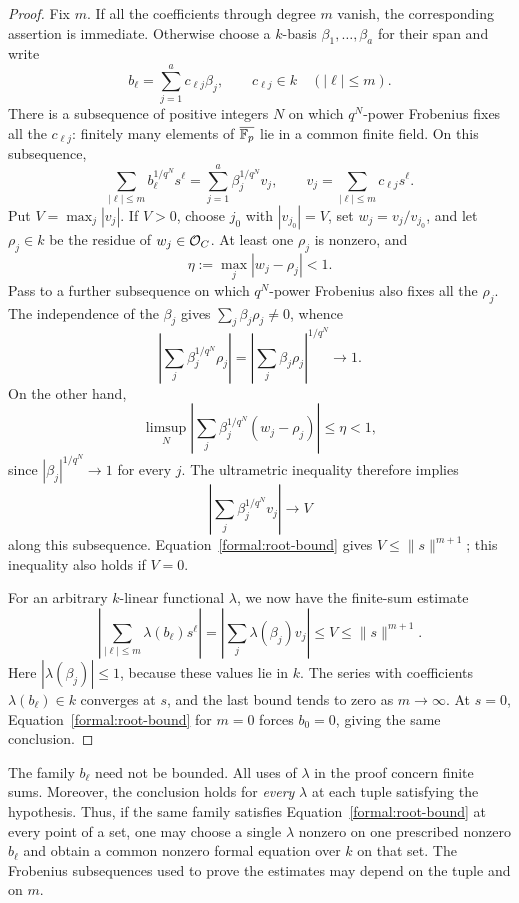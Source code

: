 \begin{proof}
Fix $m$. If all the coefficients through degree $m$ vanish, the
corresponding assertion is immediate. Otherwise choose a $k$-basis
$\beta_1,\ldots,\beta_a$ for their span and write
\[
  b_\ell=\sum_{j=1}^a c_{\ell j}\beta_j,
  \qquad c_{\ell j}\in k\quad (|\ell|\leq m).
\]
There is a subsequence of positive integers $N$ on which $q^N$-power
Frobenius fixes all the $c_{\ell j}$: finitely many elements of
$\overline{\mathbb F_p}$ lie in a common finite field. On this subsequence,
\[
  \sum_{|\ell|\leq m}b_\ell^{1/q^N}s^\ell
  =\sum_{j=1}^a\beta_j^{1/q^N}v_j,
  \qquad v_j=\sum_{|\ell|\leq m}c_{\ell j}s^\ell.
\]
Put $V=\max_j|v_j|$. If $V>0$, choose $j_0$ with $|v_{j_0}|=V$,
set $w_j=v_j/v_{j_0}$, and let $\rho_j\in k$ be the residue of
$w_j\in\mathcal O_C$. At least one $\rho_j$ is nonzero, and
\[
  \eta:=\max_j|w_j-\rho_j|<1.
\]
Pass to a further subsequence on which $q^N$-power Frobenius also fixes
all the $\rho_j$. The independence of the $\beta_j$ gives
$\sum_j\beta_j\rho_j\ne0$, whence
\[
  \left|\sum_j\beta_j^{1/q^N}\rho_j\right|
  =\left|\sum_j\beta_j\rho_j\right|^{1/q^N}
  \longrightarrow1.
\]
On the other hand,
\[
  \limsup_N
  \left|\sum_j\beta_j^{1/q^N}(w_j-\rho_j)\right|
  \leq\eta<1,
\]
since $|\beta_j|^{1/q^N}\to1$ for every $j$. The ultrametric
inequality therefore implies
\[
  \left|\sum_j\beta_j^{1/q^N}v_j\right|\longrightarrow V
\]
along this subsequence. Equation~\eqref{formal:root-bound} gives
$V\leq\|s\|^{m+1}$; this inequality also holds if $V=0$.

For an arbitrary $k$-linear functional $\lambda$, we now have the
finite-sum estimate
\[
  \left|\sum_{|\ell|\leq m}\lambda(b_\ell)s^\ell\right|
  =\left|\sum_j\lambda(\beta_j)v_j\right|
  \leq V\leq\|s\|^{m+1}.
\]
Here $|\lambda(\beta_j)|\leq1$, because these values lie in $k$.
The series with coefficients $\lambda(b_\ell)\in k$ converges at
$s$, and the last bound tends to zero as $m\to\infty$. At $s=0$,
Equation~\eqref{formal:root-bound} for $m=0$ forces $b_0=0$, giving
the same conclusion.
\end{proof}

\begin{remark}\label{formal:separation-quantifiers}
The family $b_\ell$ need not be bounded. All uses of $\lambda$ in
the proof concern finite sums. Moreover, the conclusion holds for
\emph{every} $\lambda$ at each tuple satisfying the hypothesis.
Thus, if the same family satisfies Equation~\eqref{formal:root-bound}
at every point of a set, one may choose a single $\lambda$ nonzero on
one prescribed nonzero $b_\ell$ and obtain a common nonzero formal
equation over $k$ on that set. The Frobenius subsequences used to prove
the estimates may depend on the tuple and on $m$.
\end{remark}

